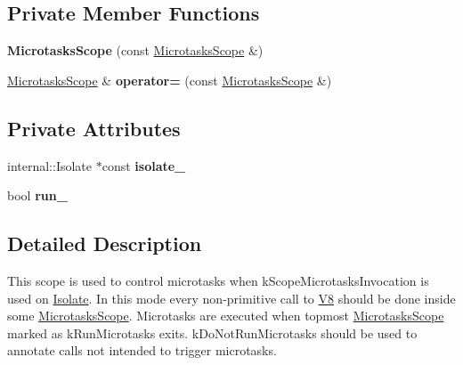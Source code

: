 \subsection*{Private Member Functions}
\begin{DoxyCompactItemize}
\item 
{\bfseries Microtasks\+Scope} (const \hyperlink{classv8_1_1_microtasks_scope}{Microtasks\+Scope} \&)\hypertarget{classv8_1_1_microtasks_scope_a393a4ab5a2737ca8dc64d37bfffbc50b}{}\label{classv8_1_1_microtasks_scope_a393a4ab5a2737ca8dc64d37bfffbc50b}

\item 
\hyperlink{classv8_1_1_microtasks_scope}{Microtasks\+Scope} \& {\bfseries operator=} (const \hyperlink{classv8_1_1_microtasks_scope}{Microtasks\+Scope} \&)\hypertarget{classv8_1_1_microtasks_scope_aa50f4629682aa6ae194f230e1f6f7743}{}\label{classv8_1_1_microtasks_scope_aa50f4629682aa6ae194f230e1f6f7743}

\end{DoxyCompactItemize}
\subsection*{Private Attributes}
\begin{DoxyCompactItemize}
\item 
internal\+::\+Isolate $\ast$const {\bfseries isolate\+\_\+}\hypertarget{classv8_1_1_microtasks_scope_a712ddabc8187fd73fad07c96127066f1}{}\label{classv8_1_1_microtasks_scope_a712ddabc8187fd73fad07c96127066f1}

\item 
bool {\bfseries run\+\_\+}\hypertarget{classv8_1_1_microtasks_scope_ab05a25efd19e42e557d83a511c2283d6}{}\label{classv8_1_1_microtasks_scope_ab05a25efd19e42e557d83a511c2283d6}

\end{DoxyCompactItemize}


\subsection{Detailed Description}
This scope is used to control microtasks when k\+Scope\+Microtasks\+Invocation is used on \hyperlink{classv8_1_1_isolate}{Isolate}. In this mode every non-\/primitive call to \hyperlink{classv8_1_1_v8}{V8} should be done inside some \hyperlink{classv8_1_1_microtasks_scope}{Microtasks\+Scope}. Microtasks are executed when topmost \hyperlink{classv8_1_1_microtasks_scope}{Microtasks\+Scope} marked as k\+Run\+Microtasks exits. k\+Do\+Not\+Run\+Microtasks should be used to annotate calls not intended to trigger microtasks. 

